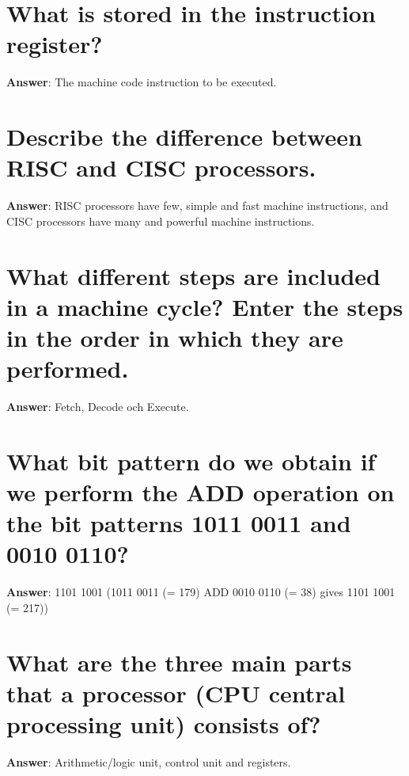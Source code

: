 \documentclass[a4paper,11pt,oneside]{book}
\begin{document}
\begin{sloppypar}
\section{What is stored in the instruction register?}

\label{q:96:sa:en:True}

\textbf{Answer}: The machine code instruction to be executed.



\section{Describe the difference between RISC and CISC processors.}

\label{q:97:sa:en:True}

\textbf{Answer}: RISC processors have few, simple and fast machine instructions, and CISC processors have many and powerful machine instructions.



\section{What different steps are included in a machine cycle? Enter the steps in the order in which they are performed.}

\label{q:98:sa:en:True}

\textbf{Answer}: Fetch, Decode och Execute.



\section{What bit pattern do we obtain if we perform the ADD operation on the bit patterns 1011 0011 and 0010 0110?}

\label{q:99:sa:en:True}

\textbf{Answer}: 1101 1001 (1011 0011 (= 179) ADD 0010 0110 (= 38) gives 1101 1001 (= 217))



\section{What are the three main parts that a processor (CPU {\textendash} central processing unit) consists of?}

\label{q:100:sa:en:True}

\textbf{Answer}: Arithmetic/logic unit, control unit and registers.




\end{sloppypar}
\end{document}
